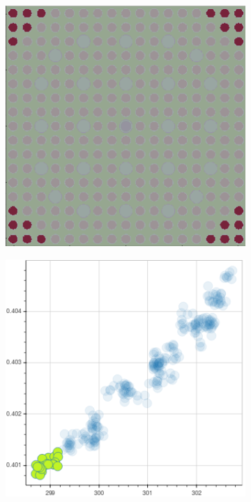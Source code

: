 \begin{figure}[h!]
\begin{subfigure}{0.42\textwidth}
  \caption{}
  \label{fig:chap10-fiss-mean-nuc-frac-mgxs}
\end{subfigure}
\begin{subfigure}{0.42\textwidth}
  \centering
  \includegraphics[width=0.9\linewidth]{figures/unsupervised/features/assm-16/u235-fiss/mean-nuc-frac/geometry-2}
  \caption{}
  \label{fig:chap10-fiss-mean-nuc-frac-geom-2}
\end{subfigure}%
\begin{subfigure}{0.42\textwidth}
  \centering
  \includegraphics[width=0.9\linewidth]{figures/unsupervised/features/assm-16/u235-fiss/mean-nuc-frac/mgxs-2}

\end{subfigure}
\end{figure}
